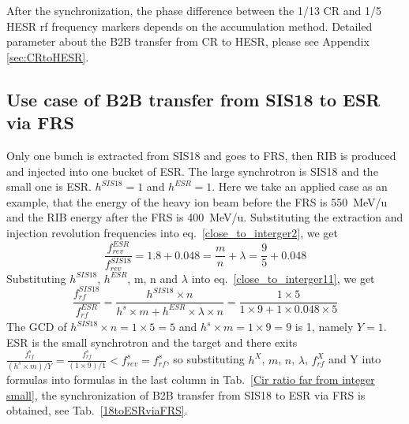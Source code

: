 After the synchronization, the phase difference between the 1/13 CR and 1/5 HESR rf frequency markers depends on the accumulation method. Detailed parameter about the B2B transfer from CR to HESR, please see Appendix \ref{sec:CRtoHESR}. 
\subsection{Use case of B2B transfer from SIS18 to ESR via FRS} 
Only one bunch is extracted from SIS18 and goes to FRS, then RIB is produced and injected into one bucket of ESR. The large synchrotron is SIS18 and the small one is ESR. $h^{\mathit{SIS18}}=1$ and $h^{\mathit{ESR}}=1$. Here we take an applied case as an example, that the energy of the heavy ion beam before the FRS is \SI{550}{MeV/\atomicmassunit} and the RIB energy after the FRS is \SI{400}{MeV/\atomicmassunit}. Substituting the extraction and injection revolution frequencies into eq.~\ref{close_to_interger2}, we get
\begin{equation} 
\frac{f_{\mathit{rev}}^{\mathit{ESR}}}{f_{\mathit{rev}}^{\mathit{SIS18}}}=1.8+0.048=\frac{m}{n}+ \lambda=\frac{9}{5}+0.048
\end{equation}
Substituting $h^{\mathit{SIS18}}$, $h^{\mathit{ESR}}$, m, n and $\lambda$ into eq.~\ref{close_to_interger11}, we get
\begin{equation}
\frac{f_{\mathit{rf}}^{\mathit{SIS18}}}{f_{\mathit{rf}}^{\mathit{ESR}}}=\frac{h^{\mathit{SIS18}}\times n}{h^s \times m+ h^{\mathit{ESR}} \times\lambda\times n}=\frac{1\times 5}{1 \times 9+1 \times0.048\times 5}
\end{equation}
The GCD of $h^{\mathit{SIS18}}\times n=1\times5=5$ and $h^s \times m=1\times 9=9$ is 1, namely $Y=1$. ESR is the small synchrotron and the target and there exits $\frac{f_{\mathit{rf}}^{s}}{(h^s\times m)/Y}=\frac{f_{\mathit{rf}}^{s}}{(1\times 9)/1}<f_{\mathit{rev}}^{s}=f_{\mathit{rf}}^{s}$, so substituting $h^X$, $m$, $n$, $\lambda$, $f_{\mathit{rf}}^{X}$ and Y into formulas into formulas in the last column in Tab.~\ref{Cir ratio far from integer small}, the synchronization of B2B transfer from SIS18 to ESR via FRS is obtained, see Tab.~\ref{18toESRviaFRS}.
